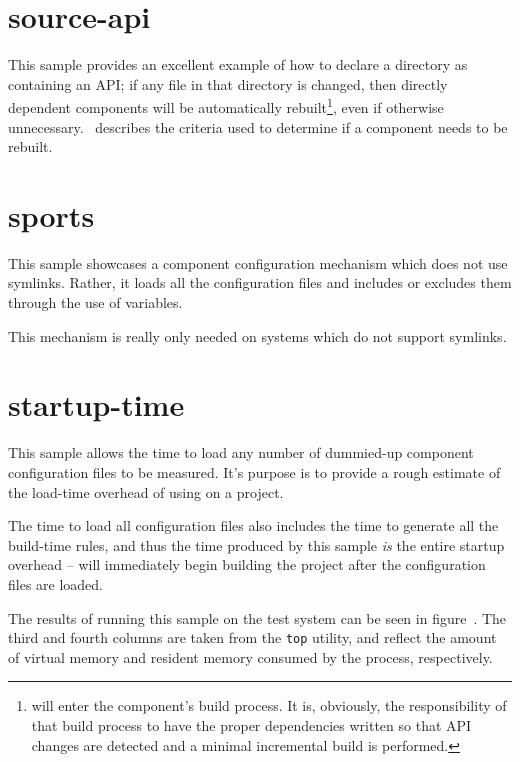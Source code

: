 \section{source-api}

This sample provides an excellent example of how to declare a \destdir
directory as containing an API; if any file in that directory is
changed, then directly dependent components will be automatically
rebuilt\footnote{\lmsbw will enter the component's build process.  It
  is, obviously, the responsibility of that build process to have the
  proper dependencies written so that API changes are detected and a
  minimal incremental build is performed.}, even if otherwise
unnecessary.  ~describes the
criteria used to determine if a component needs to be rebuilt.

\section{sports}\label{samples:sports}

This sample showcases a component configuration mechanism which does
not use symlinks.  Rather, it loads all the configuration files and
includes or excludes them through the use of \make variables.

This mechanism is really only needed on systems which do not support
symlinks.

\section{startup-time}\label{samples:startup-time}

This sample allows the time to load any number of dummied-up component
configuration files to be measured. It's purpose is to provide a rough
estimate of the load-time overhead of using \lmsbw on a project.

The time to load all configuration files also includes the time to
generate all the build-time \make rules, and thus the time produced by
this sample \emph{is} the entire startup overhead -- \make will
immediately begin building the project after the configuration files
are loaded.

The results of running this sample on the test system can be seen in
figure~.  The third and fourth
columns are taken from the \texttt{top} utility, and reflect the
amount of virtual memory and resident memory consumed by the process,
respectively.

